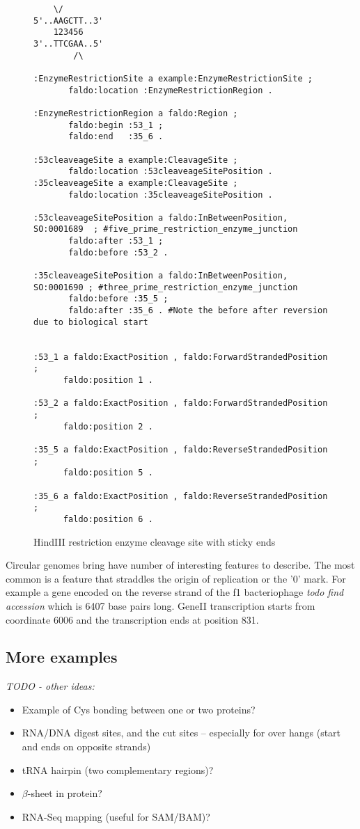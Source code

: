\begin{figure}
\begin{framed}
\small
\begin{verbatim}
    \/
5'..AAGCTT..3' 
    123456
3'..TTCGAA..5'
        /\
        
:EnzymeRestrictionSite a example:EnzymeRestrictionSite ;
       faldo:location :EnzymeRestrictionRegion .
       
:EnzymeRestrictionRegion a faldo:Region ;
       faldo:begin :53_1 ;
       faldo:end   :35_6 .
       
:53cleaveageSite a example:CleavageSite ;
       faldo:location :53cleaveageSitePosition .
:35cleaveageSite a example:CleavageSite ;
       faldo:location :35cleaveageSitePosition .
        
:53cleaveageSitePosition a faldo:InBetweenPosition, SO:0001689  ; #five_prime_restriction_enzyme_junction 
       faldo:after :53_1 ;        
       faldo:before :53_2 .
       
:35cleaveageSitePosition a faldo:InBetweenPosition, SO:0001690 ; #three_prime_restriction_enzyme_junction 
       faldo:before :35_5 ;
       faldo:after :35_6 . #Note the before after reversion due to biological start      

       
:53_1 a faldo:ExactPosition , faldo:ForwardStrandedPosition ;
      faldo:position 1 .

:53_2 a faldo:ExactPosition , faldo:ForwardStrandedPosition ;
      faldo:position 2 .

:35_5 a faldo:ExactPosition , faldo:ReverseStrandedPosition ;
      faldo:position 5 .

:35_6 a faldo:ExactPosition , faldo:ReverseStrandedPosition ;
      faldo:position 6 .
\end{verbatim}
\end{framed}
\caption{HindIII restriction enzyme cleavage site with sticky ends}
\label{fig:HindIII}
\end{figure}

Circular genomes bring have number of interesting features to describe. 
The most common is  a feature that straddles the origin of replication or the '0' mark.
For example a gene encoded on the reverse strand of the f1 bacteriophage \textit{todo find accession} which is 6407 base pairs long.
GeneII transcription starts from coordinate 6006 and the transcription ends at position 831.


\subsection*{More examples}

\textit{TODO - other ideas:}
\begin{itemize}
\item Example of Cys bonding between one or two proteins?
\item RNA/DNA digest sites, and the cut sites -- especially for over hangs (start and ends on opposite strands)
\item tRNA hairpin (two complementary regions)?
\item $\beta$-sheet in protein?
\item RNA-Seq mapping (useful for SAM/BAM)?
\end{itemize}


